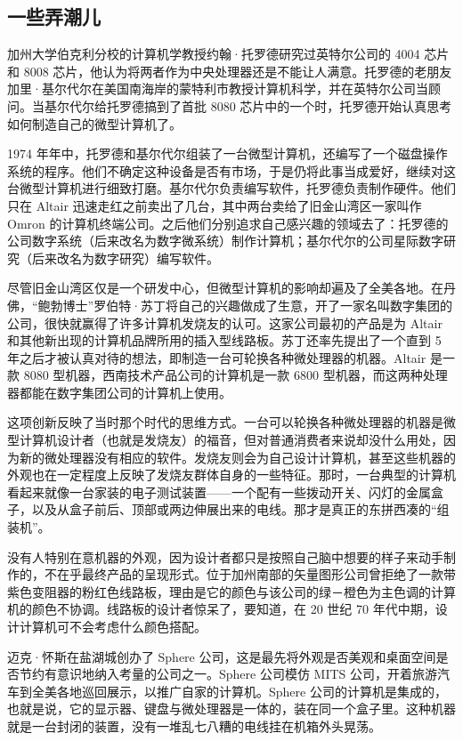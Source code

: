 \documentclass[12pt,UTF8]{ctexbook}
\begin{document}
\subsection{一些弄潮儿}


加州大学伯克利分校的计算机学教授约翰·托罗德研究过英特尔公司的 4004 芯片和 8008 芯片，他认为将两者作为中央处理器还是不能让人满意。托罗德的老朋友加里·基尔代尔在美国南海岸的蒙特利市教授计算机科学，并在英特尔公司当顾问。当基尔代尔给托罗德搞到了首批 8080 芯片中的一个时，托罗德开始认真思考如何制造自己的微型计算机了。

1974 年年中，托罗德和基尔代尔组装了一台微型计算机，还编写了一个磁盘操作系统的程序。他们不确定这种设备是否有市场，于是仍将此事当成爱好，继续对这台微型计算机进行细致打磨。基尔代尔负责编写软件，托罗德负责制作硬件。他们只在 Altair 迅速走红之前卖出了几台，其中两台卖给了旧金山湾区一家叫作 Omron 的计算机终端公司。之后他们分别追求自己感兴趣的领域去了：托罗德的公司数字系统（后来改名为数字微系统）制作计算机；基尔代尔的公司星际数字研究（后来改名为数字研究）编写软件。

尽管旧金山湾区仅是一个研发中心，但微型计算机的影响却遍及了全美各地。在丹佛，“鲍勃博士”罗伯特·苏丁将自己的兴趣做成了生意，开了一家名叫数字集团的公司，很快就赢得了许多计算机发烧友的认可。这家公司最初的产品是为 Altair 和其他新出现的计算机品牌所用的插入型线路板。苏丁还率先提出了一个直到 5 年之后才被认真对待的想法，即制造一台可轮换各种微处理器的机器。Altair 是一款 8080 型机器，西南技术产品公司的计算机是一款 6800 型机器，而这两种处理器都能在数字集团公司的计算机上使用。

这项创新反映了当时那个时代的思维方式。一台可以轮换各种微处理器的机器是微型计算机设计者（也就是发烧友）的福音，但对普通消费者来说却没什么用处，因为新的微处理器没有相应的软件。发烧友则会为自己设计计算机，甚至这些机器的外观也在一定程度上反映了发烧友群体自身的一些特征。那时，一台典型的计算机看起来就像一台家装的电子测试装置——一个配有一些拨动开关、闪灯的金属盒子，以及从盒子前后、顶部或两边伸展出来的电线。那才是真正的东拼西凑的“组装机”。

没有人特别在意机器的外观，因为设计者都只是按照自己脑中想要的样子来动手制作的，不在乎最终产品的呈现形式。位于加州南部的矢量图形公司曾拒绝了一款带紫色变阻器的粉红色线路板，理由是它的颜色与该公司的绿－橙色为主色调的计算机的颜色不协调。线路板的设计者惊呆了，要知道，在 20 世纪 70 年代中期，设计计算机可不会考虑什么颜色搭配。

迈克·怀斯在盐湖城创办了 Sphere 公司，这是最先将外观是否美观和桌面空间是否节约有意识地纳入考量的公司之一。Sphere 公司模仿 MITS 公司，开着旅游汽车到全美各地巡回展示，以推广自家的计算机。Sphere 公司的计算机是集成的，也就是说，它的显示器、键盘与微处理器是一体的，装在同一个盒子里。这种机器就是一台封闭的装置，没有一堆乱七八糟的电线挂在机箱外头晃荡。
\end{document}
